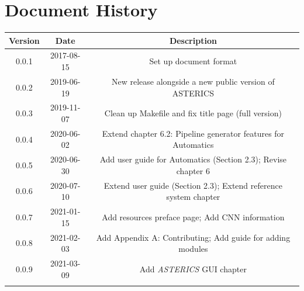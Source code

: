 \documentclass[12pt,english]{scrreprt}
\newcommand{\asterics}{\textit{ASTERICS}\xspace}
\begin{document}
\begin{titlepage}
\begin{center}

\end{center}

\end{titlepage}





\chapter*{Document History}

\begin{tabular}{|c|c|c|}
\hline 
\textbf{Version} & \textbf{Date} & \textbf{Description} \\
\hline 
\hline 
0.0.1 & 2017-08-15 & Set up document format \\
\hline 
0.0.2 & 2019-06-19 & New release alongside a new public version of ASTERICS \\
\hline 
0.0.3 & 2019-11-07 & Clean up Makefile and fix title page (full version) \\
\hline 
0.0.4 & 2020-06-02 & Extend chapter 6.2: Pipeline generator features for Automatics \\
\hline 
0.0.5 & 2020-06-30 & Add user guide for Automatics (Section 2.3); Revise chapter 6\\
\hline 
0.0.6 & 2020-07-10 & Extend user guide (Section 2.3); Extend reference system chapter\\
\hline 
0.0.7 & 2021-01-15 & Add resources preface page; Add CNN information\\
\hline 
0.0.8 & 2021-02-03 & Add Appendix A: Contributing; Add guide for adding modules\\
\hline 
0.0.9 & 2021-03-09 & Add \asterics GUI chapter \\
\hline 
 & & \\
\hline 
\end{tabular}
\end{document}
